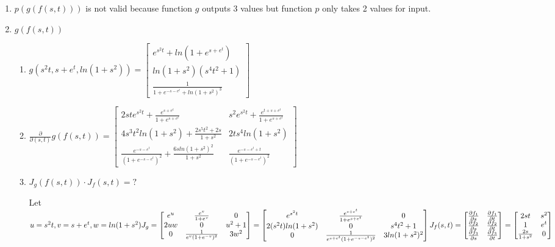 \documentclass[12pt]{article}
\begin{document}
\begin{enumerate}
	\item $p(g(f(s,t)))$ is not valid because function $g$ outputs 3 values but function $p$ only takes 2 values for input.
	
	\item $g(f(s,t))$ \begin{enumerate}[i]
		\item $g(s^2t, s+e^t, ln(1+s^2)) = \begin{bmatrix}
		e^{s^2t} + ln(1+e^{s+e^t}) \\
		ln(1+s^2)(s^4t^2+1) \\
		\frac{1}{1+e^{-s-e^t} + ln(1+s^2)^3}
		\end{bmatrix}$
	\item $\frac{\partial}{\partial(s,t)} g(f(s,t)) = \begin{bmatrix}
	2ste^{s^2t}+\frac{e^{s+e^t}}{1+e^{s+e^t}} & s^2e^{s^2t}+\frac{e^{t+s+e^t}}{1+e^{s+e^t}} \\
	4s^3t^2ln(1+s^2)+\frac{2s^5t^2+2s}{1+s^2} & 2ts^4ln(1+s^2) \\
	\frac{e^{-s-e^t}}{(1+e^{-s-e^t})^2}+\frac{6sln(1+s^2)^2}{1+s^2} & \frac{e^{-s-e^t+t}}{(1+e^{-s-e^t})^2}
	\end{bmatrix}$
	\item $J_g(f(s,t)) \cdot J_f(s,t) = ?$
	
	Let $u=s^2t, v=s+e^t, w=ln(1+s^2) \\
	J_g = \begin{bmatrix}
	e^u & \frac{e^v}{1+e^v} & 0 \\
	2uw & 0 & u^2+1 \\
	0 & \frac{1}{e^v (1+e^{-v})^2} & 3w^2
	\end{bmatrix} = \begin{bmatrix}
	e^{s^2t} & \frac{e^{s+e^t}}{1+e^{s+e^t}} & 0 \\
	2(s^2t)ln(1+s^2) & 0 & s^4t^2+1 \\
	0 & \frac{1}{e^{s+e^t}(1+e^{-s-e^t})^2} & 3ln(1+s^2)^2
	\end{bmatrix} 
	 \\ J_f(s,t) = \begin{bmatrix}
	\frac{\partial f_1}{\partial s} & \frac{\partial f_1}{\partial t} \\
	\frac{\partial f_2}{\partial s} & \frac{\partial f_2}{\partial t} \\
	\frac{\partial f_3}{\partial s} & \frac{\partial f_3}{\partial t} 
	\end{bmatrix}
	= \begin{bmatrix}
	2st & s^2 \\
	1 & e^t \\
	\frac{2s}{1+s^2} & 0
	\end{bmatrix}
	$
	

\end{enumerate}
\end{enumerate}
\end{document}

